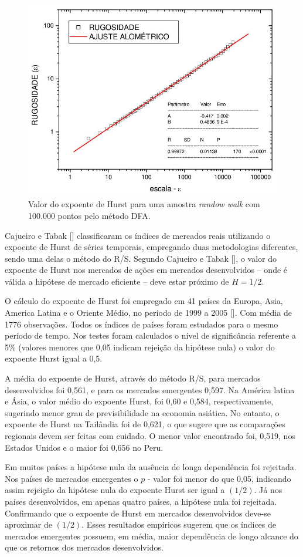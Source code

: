 \documentclass[brazil,ruledheader]{abnt}
\renewcommand{\cite}[1]{[\citeonline{#1}]}
\begin{document}
\begin{figure}[!h]
 \centering
\includegraphics[width=.7\linewidth]{Figuras/figura9.jpg}
\caption[O expoente de Hurst no \emph{randow walk}] {Valor do expoente de Hurst
para uma amostra \emph{randow walk} com
100.000 pontos
pelo método DFA.}
\label{fig:grafico1}
\end{figure}


Cajueiro e Tabak \cite{CaTa08} classificaram os índices de mercados reais
utilizando o expoente de Hurst de séries temporais, empregando duas metodologias
diferentes,
sendo uma delas o método do R/S. Segundo Cajueiro e Tabak \cite{CaTa08, CaTa04},
o valor do expoente de Hurst nos mercados de ações em mercados desenvolvidos --
onde é válida a hipótese de mercado eficiente -- deve estar próximo de $H=1/2$.

O cálculo do expoente de Hurst foi empregado em 41 países da Europa, Asia,
America Latina e o Oriente Médio, no período de 1999 a 2005 \cite{CaTa08}. Com
 média de 1776 observações. Todos os índices de países foram estudados para o
mesmo período de tempo. Nos testes foram calculados o nível de significância
referente a 5\% (valores menores que 0,05 indicam rejeição da hipótese nula)
o valor do expoente Hurst igual a 0,5.

A média do expoente de Hurst, através do método R/S, para mercados desenvolvidos
foi 0,561, e para os mercados emergentes 0,597. Na América latina e Ásia, o
valor médio do expoente Hurst, foi 0,60 e 0,584, respectivamente, sugerindo
menor grau de previsibilidade na economia asiática. No entanto, o expoente de
Hurst na Tailândia foi de 0,621, o que sugere que as comparações regionais devem
ser feitas com cuidado. O menor valor encontrado foi, 0,519, nos Estados Unidos
e o maior foi  0,656 no Peru.

Em muitos países a hipótese nula da ausência de longa dependência foi
rejeitada. Nos países de mercados emergentes o $p$ - valor foi menor do que
0,05, indicando assim rejeição da hipótese nula do expoente Hurst ser igual a
$(1/2)$.  Já nos países desenvolvidos, em apenas quatro países, a hipótese
nula foi
rejeitada.  Confirmando  que o expoente de Hurst em mercados
desenvolvidos deve-se aproximar de $(1/2)$. Esses resultados empíricos sugerem
que
os
índices de mercados emergentes possuem, em média, maior dependência de longo
alcance do que os retornos dos mercados desenvolvidos. 
\end{document}
